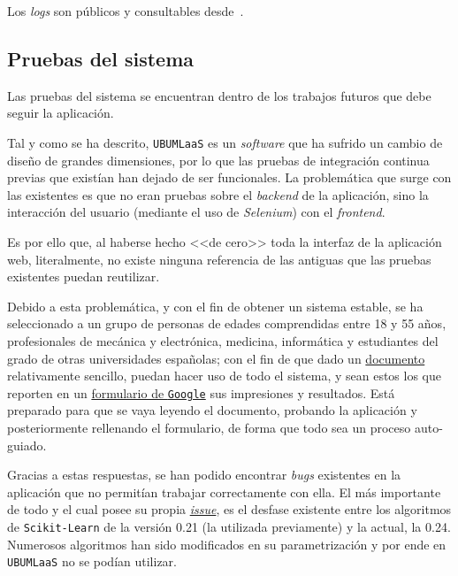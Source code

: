 Los \textit{logs} son públicos y consultables desde~\cite{Travis-CI-LOG-UBUMLaaS}.


\subsection{Pruebas del sistema}
Las pruebas del sistema se encuentran dentro de los trabajos futuros que debe seguir la aplicación.

Tal y como se ha descrito, \texttt{UBUMLaaS} es un \textit{software} que ha sufrido un cambio de diseño de grandes dimensiones, por lo que las pruebas de integración continua previas que existían han dejado de ser funcionales. La problemática que surge con las existentes es que no eran pruebas sobre el \textit{backend} de la aplicación, sino la interacción del usuario (mediante el uso de \textit{Selenium}) con el \textit{frontend}. 

Es por ello que, al haberse hecho <<de cero>> toda la interfaz de la aplicación web, literalmente, no existe ninguna referencia de las antiguas que las pruebas existentes puedan reutilizar. 

Debido a esta problemática, y con el fin de obtener un sistema estable, se ha seleccionado a un grupo de personas de edades comprendidas entre 18 y 55 años, profesionales de mecánica y electrónica, medicina, informática y estudiantes del grado de otras universidades españolas; con el fin de que dado un \href{https://github.com/dpr1005/Semisupervised-learning-and-instance-selection-methods/blob/917d49bcc9d7f1a4825225414b246023bfa2ea7b/docs/misc/survey_steps.pdf}{documento} relativamente sencillo, puedan hacer uso de todo el sistema, y sean estos los que reporten en un \href{https://forms.gle/eZUWmT5GNahqYVVa6}{formulario de \texttt{Google}} sus impresiones y resultados. Está preparado para que se vaya leyendo el documento, probando la aplicación y posteriormente rellenando el formulario, de forma que todo sea un proceso auto-guiado.

Gracias a estas respuestas, se han podido encontrar \textit{bugs} existentes en la aplicación que no permitían trabajar correctamente con ella. El más importante de todo y el cual posee su propia \href{https://github.com/dpr1005/UBUMLaaS/issues/101}{\textit{issue}}, es el desfase existente entre los algoritmos de \texttt{Scikit-Learn} de la versión 0.21 (la utilizada previamente) y la actual, la 0.24. Numerosos algoritmos han sido modificados en su parametrización y por ende en \texttt{UBUMLaaS} no se podían utilizar.

